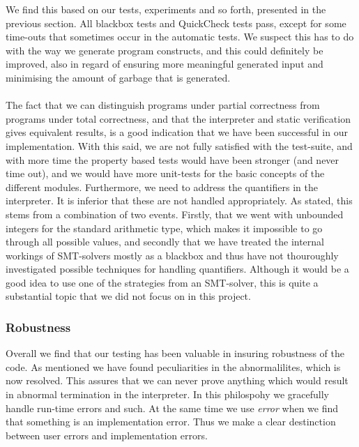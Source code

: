We find this based on our tests, experiments and so forth, presented in the previous section.
All blackbox tests and QuickCheck tests pass, except for some time-outs that sometimes occur in the automatic tests. We suspect this has to do with the way we generate program constructs, and this could definitely be improved, also in regard of ensuring more meaningful generated input and minimising the amount of garbage that is generated.
\\~\\
The fact that we can distinguish programs under partial correctness from programs under total correctness, and that the interpreter and static verification gives equivalent results, is a good indication that we have been successful in our implementation.
With this said, we are not fully satisfied with the test-suite, and with more time the property based tests would have been stronger (and never time out), and we would have more unit-tests for the basic concepts of the different modules.
Furthermore, we need to address the quantifiers in the interpreter.
It is inferior that these are not handled appropriately.
As stated, this stems from a combination of two events.
Firstly, that we went with unbounded integers for the standard arithmetic type, which makes it impossible to go through all possible values, and secondly that we have treated the internal workings of SMT-solvers mostly as a blackbox and thus have not thouroughly investigated possible techniques for handling quantifiers. 
Although it would be a good idea to use one of the strategies from an SMT-solver, this is quite a substantial topic that we did not focus on in this project.


\subsubsection{Robustness}
Overall we find that our testing has been valuable in insuring robustness of the code. As mentioned we have found peculiarities in the abnormalilites, which is now resolved. 
This assures that we can never prove anything which would result in abnormal termination in the interpreter. 
In this philospohy we gracefully handle run-time errors and such. 
At the same time we use \textit{error} when we find that something is an implementation error. 
Thus we make a clear destinction between user errors and implementation errors.

